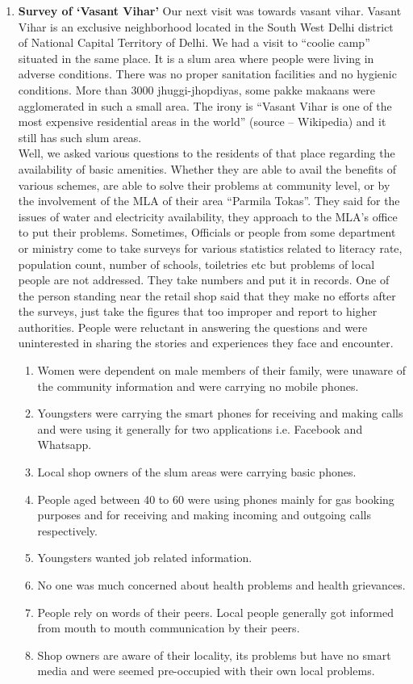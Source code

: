 \begin{enumerate}
\item \textbf {Survey of ‘Vasant Vihar’}
Our next visit was towards vasant vihar. Vasant Vihar is an exclusive
neighborhood located in the South West Delhi district of National Capital Territory
of Delhi. We had a visit to “coolie camp” situated in the same place. It is a slum area
where people were living in adverse conditions. There was no proper sanitation
facilities and no hygienic conditions. More than 3000 jhuggi-jhopdiyas, some pakke
makaans were agglomerated in such a small area. The irony is “Vasant Vihar is one
of the most expensive residential areas in the world” (source – Wikipedia) and it
still has such slum areas.\\
Well, we asked various questions to the residents of that place regarding the
availability of basic amenities. Whether they are able to avail the benefits of various
schemes, are able to solve their problems at community level, or by the involvement
of the MLA of their area “Parmila Tokas”. They said for the issues of water and
electricity availability, they approach to the MLA’s office to put their problems.
Sometimes, Officials or people from some department or ministry come to take
surveys for various statistics related to literacy rate, population count, number of
schools, toiletries etc but problems of local people are not addressed. They take
numbers and put it in records. One of the person standing near the retail shop said
that they make no efforts after the surveys, just take the figures that too improper
and report to higher authorities. People were reluctant in answering the questions and were uninterested in sharing
the stories and experiences they face and encounter.

\begin{enumerate}
\item  Women were dependent on male members of their family, were unaware of the community information and were carrying no mobile phones.
\item Youngsters were carrying the smart phones for receiving and making calls
and were using it generally for two applications i.e. Facebook and Whatsapp.
\item Local shop owners of the slum areas were carrying basic phones.
\item People aged between 40 to 60 were using phones mainly for gas booking
purposes and for receiving and making incoming and outgoing calls
respectively.
\item Youngsters wanted job related information.
\item No one was much concerned about health problems and health grievances.
\item People rely on words of their peers. Local people generally got informed from
mouth to mouth communication by their peers.
\item Shop owners are aware of their locality, its problems but have no smart
media and were seemed pre-occupied with their own local problems.
\end{enumerate}



\end{enumerate}
